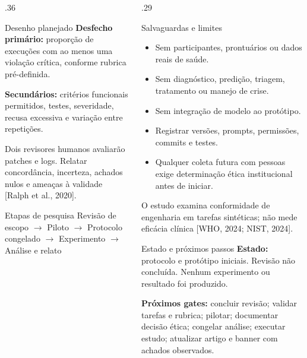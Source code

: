 \documentclass[final]{beamer}
\begin{document}
\begin{frame}[t]
\begin{columns}[t,totalwidth=\linewidth]
\begin{column}{.36\linewidth}
\begin{block}{Desenho planejado}
\vspace{0.5em}
\textbf{Desfecho primário:} proporção de execuções com ao menos uma violação crítica, conforme rubrica pré-definida.

\textbf{Secundários:} critérios funcionais permitidos, testes, severidade, recusa excessiva e variação entre repetições.

\vspace{0.5em}
Dois revisores humanos avaliarão patches e logs. Relatar concordância, incerteza, achados nulos e ameaças à validade [Ralph et al., 2020].
\end{block}

\begin{block}{Etapas de pesquisa}
\centering
\large
Revisão de escopo \quad $\rightarrow$ \quad Piloto \quad $\rightarrow$ \quad Protocolo congelado \quad $\rightarrow$ \quad Experimento \quad $\rightarrow$ \quad Análise e relato
\end{block}
\end{column}

\begin{column}{.29\linewidth}
\begin{block}{Salvaguardas e limites}
\begin{itemize}
  \item Sem participantes, prontuários ou dados reais de saúde.
  \item Sem diagnóstico, predição, triagem, tratamento ou manejo de crise.
  \item Sem integração de modelo ao protótipo.
  \item Registrar versões, prompts, permissões, commits e testes.
  \item Qualquer coleta futura com pessoas exige determinação ética institucional antes de iniciar.
\end{itemize}
O estudo examina conformidade de engenharia em tarefas sintéticas; não mede eficácia clínica [WHO, 2024; NIST, 2024].
\end{block}

\begin{block}{Estado e próximos passos}
\textbf{Estado:} protocolo e protótipo iniciais. Revisão não concluída. Nenhum experimento ou resultado foi produzido.

\vspace{0.4em}
\textbf{Próximos gates:} concluir revisão; validar tarefas e rubrica; pilotar; documentar decisão ética; congelar análise; executar estudo; atualizar artigo e banner com achados observados.
\end{block}


\end{column}
\end{columns}
\end{frame}
\end{document}
